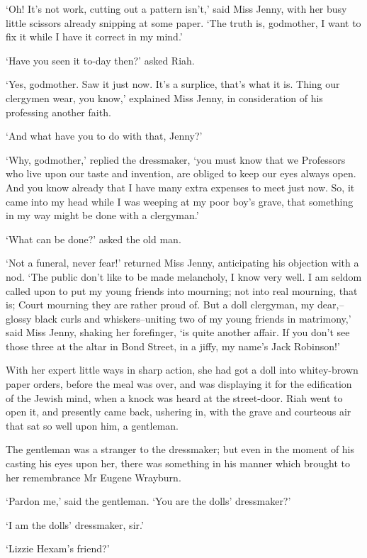 ‘Oh! It’s not work, cutting out a pattern isn’t,’ said Miss Jenny, with
her busy little scissors already snipping at some paper. ‘The truth is,
godmother, I want to fix it while I have it correct in my mind.’

‘Have you seen it to-day then?’ asked Riah.

‘Yes, godmother. Saw it just now. It’s a surplice, that’s what it
is. Thing our clergymen wear, you know,’ explained Miss Jenny, in
consideration of his professing another faith.

‘And what have you to do with that, Jenny?’

‘Why, godmother,’ replied the dressmaker, ‘you must know that we
Professors who live upon our taste and invention, are obliged to keep
our eyes always open. And you know already that I have many extra
expenses to meet just now. So, it came into my head while I was weeping
at my poor boy’s grave, that something in my way might be done with a
clergyman.’

‘What can be done?’ asked the old man.

‘Not a funeral, never fear!’ returned Miss Jenny, anticipating his
objection with a nod. ‘The public don’t like to be made melancholy, I
know very well. I am seldom called upon to put my young friends into
mourning; not into real mourning, that is; Court mourning they are
rather proud of. But a doll clergyman, my dear,--glossy black curls
and whiskers--uniting two of my young friends in matrimony,’ said Miss
Jenny, shaking her forefinger, ‘is quite another affair. If you don’t
see those three at the altar in Bond Street, in a jiffy, my name’s Jack
Robinson!’

With her expert little ways in sharp action, she had got a doll into
whitey-brown paper orders, before the meal was over, and was displaying
it for the edification of the Jewish mind, when a knock was heard at the
street-door. Riah went to open it, and presently came back, ushering in,
with the grave and courteous air that sat so well upon him, a gentleman.

The gentleman was a stranger to the dressmaker; but even in the moment
of his casting his eyes upon her, there was something in his manner
which brought to her remembrance Mr Eugene Wrayburn.

‘Pardon me,’ said the gentleman. ‘You are the dolls’ dressmaker?’

‘I am the dolls’ dressmaker, sir.’

‘Lizzie Hexam’s friend?’

